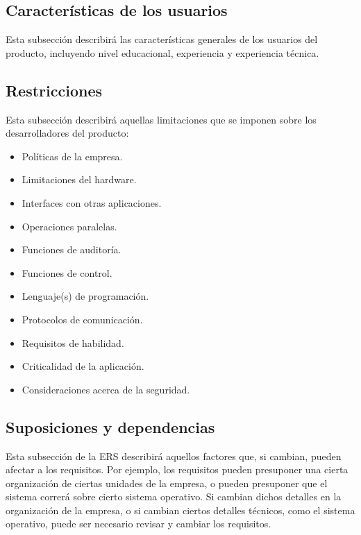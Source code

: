 \documentclass[12pt,a4paper]{article}
\begin{document}
\subsection{Características de los usuarios}
\label{sec:caracteristicas_usuarios}

Esta subsección describirá las características generales de los usuarios del producto, incluyendo nivel educacional, experiencia y experiencia técnica.

\subsection{Restricciones}
\label{sec:restricciones}

Esta subsección describirá aquellas limitaciones que se imponen sobre los desarrolladores del producto:
\begin{itemize}
    \item Políticas de la empresa.
    \item Limitaciones del hardware.
    \item Interfaces con otras aplicaciones.
    \item Operaciones paralelas.
    \item Funciones de auditoría.
    \item Funciones de control.
    \item Lenguaje(s) de programación.
    \item Protocolos de comunicación.
    \item Requisitos de habilidad.
    \item Criticalidad de la aplicación.
    \item Consideraciones acerca de la seguridad.
\end{itemize}

\subsection{Suposiciones y dependencias}
\label{sec:suposiciones_dependencias}

Esta subsección de la ERS describirá aquellos factores que, si cambian, pueden afectar a los requisitos. Por ejemplo, los requisitos pueden presuponer una cierta organización de ciertas unidades de la empresa, o pueden presuponer que el sistema correrá sobre cierto sistema operativo. Si cambian dichos detalles en la organización de la empresa, o si cambian ciertos detalles técnicos, como el sistema operativo, puede ser necesario revisar y cambiar los requisitos.
\end{document}
